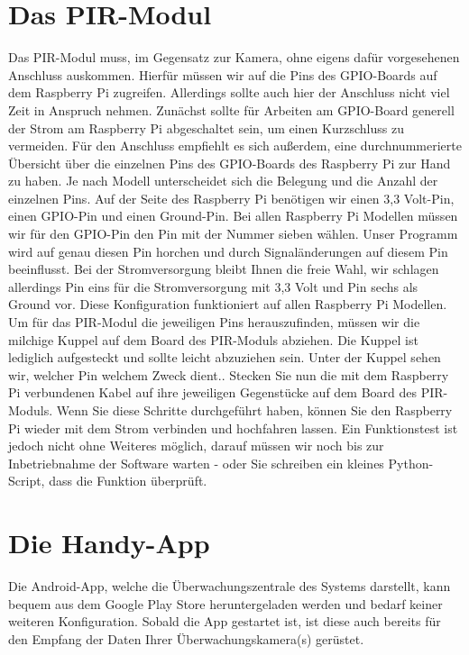 \documentclass[12pt,a4paper]{scrreprt}
\begin{document}
\section{Das PIR-Modul} 
Das PIR-Modul muss, im Gegensatz zur Kamera, ohne eigens dafür vorgesehenen Anschluss auskommen. Hierfür müssen wir auf die Pins des GPIO-Boards auf dem Raspberry Pi zugreifen. Allerdings sollte auch hier der Anschluss nicht viel Zeit in Anspruch nehmen. Zunächst sollte für Arbeiten am GPIO-Board generell der Strom am Raspberry Pi abgeschaltet sein, um einen Kurzschluss zu vermeiden. Für den Anschluss empfiehlt es sich außerdem, eine durchnummerierte Übersicht über die einzelnen Pins des GPIO-Boards des Raspberry Pi zur Hand zu haben. Je nach Modell unterscheidet sich die Belegung und die Anzahl der einzelnen Pins. Auf der Seite des Raspberry Pi benötigen wir einen 3,3 Volt-Pin, einen GPIO-Pin und einen Ground-Pin. Bei allen Raspberry Pi Modellen müssen wir für den GPIO-Pin den Pin mit der Nummer sieben wählen. Unser Programm wird auf genau diesen Pin horchen und durch Signaländerungen auf diesem Pin beeinflusst. Bei der Stromversorgung bleibt Ihnen die freie Wahl, wir schlagen allerdings Pin eins für die Stromversorgung mit 3,3 Volt und Pin sechs als Ground vor. Diese Konfiguration funktioniert auf allen Raspberry Pi Modellen. Um für das PIR-Modul die jeweiligen Pins herauszufinden, müssen wir die milchige Kuppel auf dem Board des PIR-Moduls abziehen. Die Kuppel ist lediglich aufgesteckt und sollte leicht abzuziehen sein. Unter der Kuppel sehen wir, welcher Pin welchem Zweck dient.. Stecken Sie nun die mit dem Raspberry Pi verbundenen Kabel auf ihre jeweiligen Gegenstücke auf dem Board des PIR-Moduls. Wenn Sie diese Schritte durchgeführt haben, können Sie den Raspberry Pi wieder mit dem Strom verbinden und hochfahren lassen. Ein Funktionstest ist jedoch nicht ohne Weiteres möglich, darauf müssen wir noch bis zur Inbetriebnahme der Software warten - oder Sie schreiben ein kleines Python-Script, dass die Funktion überprüft.  

\section{Die Handy-App}
Die Android-App, welche die Überwachungszentrale des Systems darstellt, kann bequem aus dem Google Play Store heruntergeladen werden und bedarf keiner weiteren Konfiguration. Sobald die App gestartet ist, ist diese auch bereits für den Empfang der Daten Ihrer Überwachungskamera(s) gerüstet.
\end{document}
